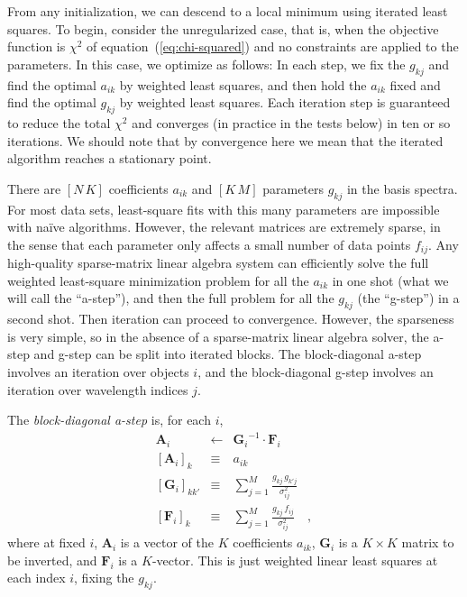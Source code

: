 \documentclass[12pt,preprint]{aastex}
\newcommand{\equationname}{equation}
\newcommand{\tv}[1]{\boldsymbol{#1}}
\newcommand{\inverse}[1]{{#1}^{-1}}
\begin{document}
From any initialization, we can descend to a local minimum using
iterated least squares.  To begin, consider the unregularized case,
that is, when the objective function is $\chi^2$ of
\equationname~(\ref{eq:chi-squared}) and no constraints are applied to
the parameters.  In this case, we optimize as follows: In each step,
we fix the $g_{kj}$ and find the optimal $a_{ik}$ by weighted least
squares, and then hold the $a_{ik}$ fixed and find the optimal
$g_{kj}$ by weighted least squares. Each iteration step is guaranteed
to reduce the total $\chi^2$ and converges (in practice in the tests
below) in ten or so iterations. We should note that by convergence 
here we mean that the iterated algorithm reaches a stationary point.

There are $[N\,K]$ coefficients $a_{ik}$ and $[K\,M]$ parameters
$g_{kj}$ in the basis spectra.  For most data sets, least-square fits
with this many parameters are impossible with na\"ive algorithms.
However, the relevant matrices are extremely sparse, in the sense that
each parameter only affects a small number of data points $f_{ij}$.
Any high-quality sparse-matrix linear algebra system can efficiently
solve the full weighted least-square minimization problem for all the
$a_{ik}$ in one shot (what we will call the ``a-step''), and then the
full problem for all the $g_{kj}$ (the ``g-step'') in a second shot.
Then iteration can proceed to convergence.  However, the sparseness is
very simple, so in the absence of a sparse-matrix linear algebra
solver, the a-step and g-step can be split into iterated blocks.  The
block-diagonal a-step involves an iteration over objects $i$, and the
block-diagonal g-step involves an iteration over wavelength indices
$j$.

The \emph{block-diagonal a-step} is, for each $i$,
\begin{eqnarray}\label{eq:astep}\displaystyle
\tv{A}_i & \gets & \inverse{\tv{G}_i}\cdot\tv{F}_i \nonumber\\
\left[\tv{A}_i\right]_k & \equiv & a_{ik} \nonumber\\
\left[\tv{G}_i\right]_{kk'} & \equiv & \sum_{j=1}^{M} \frac{g_{kj}\,g_{k'j}}{\sigma_{ij}^2} \nonumber\\
\left[\tv{F}_i\right]_k     & \equiv & \sum_{j=1}^{M} \frac{g_{kj}\,f_{i j}}{\sigma_{ij}^2}
\quad ,
\end{eqnarray}
where at fixed $i$, $\tv{A}_i$ is a vector of the $K$ coefficients
$a_{ik}$, $\tv{G}_i$ is a $K\times K$ matrix to be inverted, and
$\tv{F}_i$ is a $K$-vector.  This is just weighted linear least
squares at each index $i$, fixing the $g_{kj}$.
\end{document}
